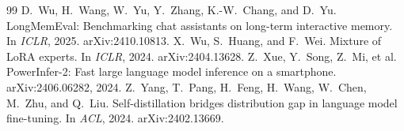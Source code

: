 \documentclass[11pt]{article}
\begin{document}
\begin{thebibliography}{99}
 D.~Wu, H.~Wang, W.~Yu, Y.~Zhang, K.-W.~Chang, and D.~Yu. LongMemEval: Benchmarking chat assistants on long-term interactive memory. In \emph{ICLR}, 2025. arXiv:2410.10813.
 X.~Wu, S.~Huang, and F.~Wei. Mixture of LoRA experts. In \emph{ICLR}, 2024. arXiv:2404.13628.
 Z.~Xue, Y.~Song, Z.~Mi, et al. PowerInfer-2: Fast large language model inference on a smartphone. arXiv:2406.06282, 2024.
 Z.~Yang, T.~Pang, H.~Feng, H.~Wang, W.~Chen, M.~Zhu, and Q.~Liu. Self-distillation bridges distribution gap in language model fine-tuning. In \emph{ACL}, 2024. arXiv:2402.13669.
\end{thebibliography}
\end{document}
